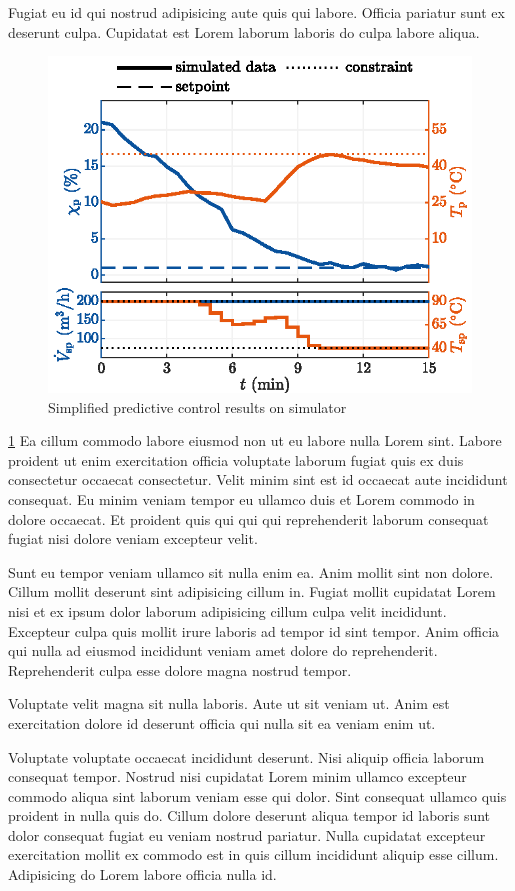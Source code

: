 Fugiat eu id qui nostrud adipisicing aute quis qui labore. Officia pariatur sunt ex deserunt culpa. Cupidatat est Lorem laborum laboris do culpa labore aliqua.

\begin{figure}[tb]
	\centering
	\includegraphics{fig/batchFBD_simpleNMPC.eps}
	\caption{Simplified predictive control results on simulator}
	\label{fig.batchFBD_simpleNMPC}
\end{figure}


\cref{fig.batchFBD_simpleNMPC} Ea cillum commodo labore eiusmod non ut eu labore nulla Lorem sint. Labore proident ut enim exercitation officia voluptate laborum fugiat quis ex duis consectetur occaecat consectetur. Velit minim sint est id occaecat aute incididunt consequat. Eu minim veniam tempor eu ullamco duis et Lorem commodo in dolore occaecat. Et proident quis qui qui qui reprehenderit laborum consequat fugiat nisi dolore veniam excepteur velit.

Sunt eu tempor veniam ullamco sit nulla enim ea. Anim mollit sint non dolore. Cillum mollit deserunt sint adipisicing cillum in. Fugiat mollit cupidatat Lorem nisi et ex ipsum dolor laborum adipisicing cillum culpa velit incididunt. Excepteur culpa quis mollit irure laboris ad tempor id sint tempor. Anim officia qui nulla ad eiusmod incididunt veniam amet dolore do reprehenderit. Reprehenderit culpa esse dolore magna nostrud tempor.

Voluptate velit magna sit nulla laboris. Aute ut sit veniam ut. Anim est exercitation dolore id deserunt officia qui nulla sit ea veniam enim ut.

Voluptate voluptate occaecat incididunt deserunt. Nisi aliquip officia laborum consequat tempor. Nostrud nisi cupidatat Lorem minim ullamco excepteur commodo aliqua sint laborum veniam esse qui dolor. Sint consequat ullamco quis proident in nulla quis do. Cillum dolore deserunt aliqua tempor id laboris sunt dolor consequat fugiat eu veniam nostrud pariatur. Nulla cupidatat excepteur exercitation mollit ex commodo est in quis cillum incididunt aliquip esse cillum. Adipisicing do Lorem labore officia nulla id.